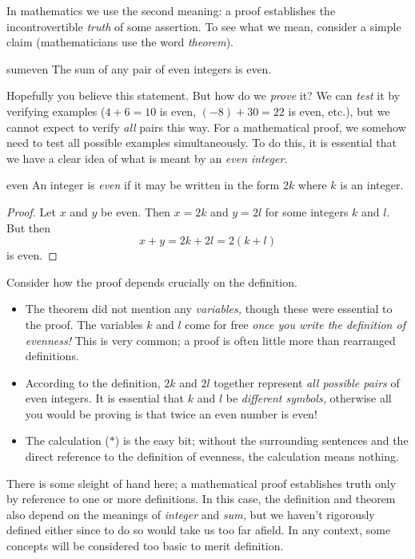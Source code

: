 In mathematics we use the second meaning: a proof establishes the incontrovertible \emph{truth} of some assertion. To see what we mean, consider a simple claim (mathematicians use the word \emph{theorem}).

\begin{thm}{}{sumeven}
	The sum of any pair of even integers is even.
\end{thm}

Hopefully you believe this statement. But how do we \emph{prove} it? We can \emph{test} it by verifying examples ($4+6=10$ is even, $(-8)+30=22$ is even, etc.), but we cannot expect to verify \emph{all} pairs this way. For a mathematical proof, we somehow need to test all possible examples simultaneously. To do this, it is essential that we have a clear idea of what is meant by an \emph{even integer.}

\begin{defn}{}{even}
	An integer is \emph{even} if it may be written in the form $2k$ where $k$ is an integer.
\end{defn}

\begin{proof}
	Let $x$ and $y$ be even. Then $x=2k$ and $y=2l$ for some integers $k$ and $l$. But then
	\[x+y=2k+2l=2(k+l)\tag{$\ast$}\]
	is even.
\end{proof}

Consider how the proof depends crucially on the definition.

\begin{itemize}%
	\item The theorem did not mention any \emph{variables,} though these were essential to the proof. The variables $k$ and $l$ come for free \emph{once you write the definition of evenness!} This is very common; a proof is often little more than rearranged definitions.
	\item According to the definition, $2k$ and $2l$ together represent \emph{all possible pairs} of even integers. It is essential that $k$ and $l$ be \emph{different symbols,} otherwise all you would be proving is that twice an even number is even!
	\item The calculation ($\ast$) is the easy bit; without the surrounding sentences and the direct reference to the definition of evenness, the calculation means nothing.
\end{itemize}

There is some sleight of hand here; a mathematical proof establishes truth only by reference to one or more definitions. In this case, the definition and theorem also depend on the meanings of \emph{integer} and \emph{sum,} but we haven't rigorously defined either since to do so would take us too far afield. In any context, some concepts will be considered too basic to merit definition.


